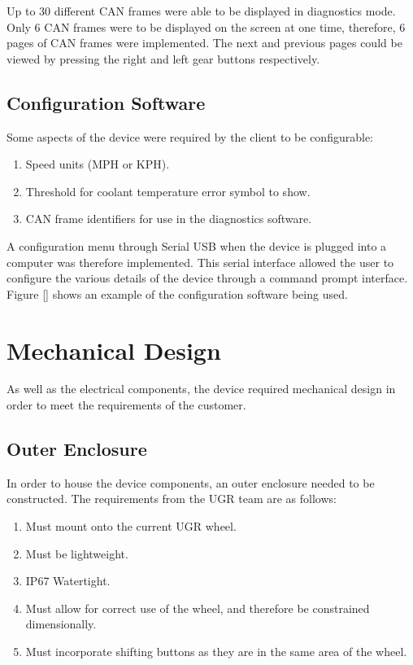 \documentclass[a4paper,12pt]{article}
\begin{document}
Up to 30 different CAN frames were able to be displayed in diagnostics mode. Only 6 CAN frames were to be displayed on the screen at one time, therefore, 6 pages of CAN frames were implemented. The next and previous pages could be viewed by pressing the right and left gear buttons respectively.

\subsection{Configuration Software}
\label{sec:configuration_software}

Some aspects of the device were required by the client to be configurable:

\begin{enumerate}
  \item Speed units (MPH or KPH).
  \item Threshold for coolant temperature error symbol to show.
  \item CAN frame identifiers for use in the diagnostics software.
\end{enumerate}
\vspace{1cm}

A configuration menu through Serial USB when the device is plugged into a computer was therefore implemented. This serial interface allowed the user to configure the various details of the device through a command prompt interface. Figure \ref{} shows an example of the configuration software being used.


\newpage
\section{Mechanical Design}
\label{sec:mechanical_design}

As well as the electrical components, the device required mechanical design in order to meet the requirements of the customer.

\subsection{Outer Enclosure}
\label{sec:outer_enclosure}

In order to house the device components, an outer enclosure needed to be constructed. The requirements from the UGR team are as follows:

\begin{enumerate}
  \item Must mount onto the current UGR wheel.
  \item Must be lightweight.
  \item IP67 Watertight.
  \item Must allow for correct use of the wheel, and therefore be constrained dimensionally.
  \item Must incorporate shifting buttons as they are in the same area of the wheel.
\end{enumerate}
\vspace{1cm}
\end{document}
